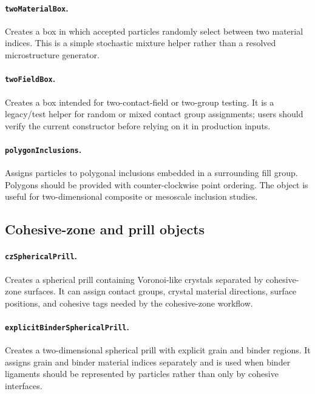 \paragraph{\texttt{twoMaterialBox}.}Creates a box in which accepted particles randomly select between two material indices.  This is a simple stochastic mixture helper rather than a resolved microstructure generator.

\paragraph{\texttt{twoFieldBox}.}Creates a box intended for two-contact-field or two-group testing.  It is a legacy/test helper for random or mixed contact group assignments; users should verify the current constructor before relying on it in production inputs.

\paragraph{\texttt{polygonInclusions}.}Assigns particles to polygonal inclusions embedded in a surrounding fill group.  Polygons should be provided with counter-clockwise point ordering.  The object is useful for two-dimensional composite or mesoscale inclusion studies.

\subsection{Cohesive-zone and prill objects}

\paragraph{\texttt{czSphericalPrill}.}Creates a spherical prill containing Voronoi-like crystals separated by cohesive-zone surfaces.  It can assign contact groups, crystal material directions, surface positions, and cohesive tags needed by the cohesive-zone workflow.

\paragraph{\texttt{explicitBinderSphericalPrill}.}Creates a two-dimensional spherical prill with explicit grain and binder regions.  It assigns grain and binder material indices separately and is used when binder ligaments should be represented by particles rather than only by cohesive interfaces.

